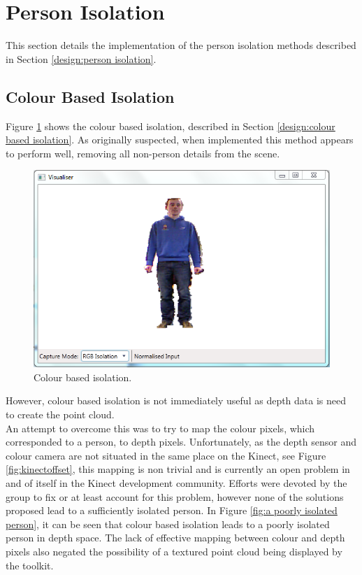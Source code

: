 \section{Person Isolation}
This section details the implementation of the person isolation methods described in Section \ref{design:person isolation}.\\

\subsection{Colour Based Isolation}
\label{imp:colour based isolation}
Figure \ref{fig:colour based cut off} shows the colour based isolation, described in Section \ref{design:colour based isolation}. As originally suspected, when implemented this method appears to perform well, removing all non-person details from the scene.\\

\begin{figure}[h]
    \begin{center}
        \includegraphics[scale=0.4]{images/parse4} 
    \end{center}
    \caption{Colour based isolation.}
    \label{fig:colour based cut off}
\end{figure} 

However, colour based isolation is not immediately useful as depth data is need to create the point cloud.\\ 

An attempt to overcome this was to try to map the colour pixels, which corresponded to a person, to depth pixels. Unfortunately, as the depth sensor and colour camera are not situated in the same place on the Kinect, see Figure \ref{fig:kinectoffset}, this mapping is non trivial and is currently an open problem in and of itself in the Kinect development community. Efforts were devoted by the group to fix or at least account for this problem, however none of the solutions proposed lead to a sufficiently isolated person. In Figure \ref{fig:a poorly isolated person}, it can be seen that colour based isolation leads to a poorly isolated person in depth space. The lack of effective mapping between colour and depth pixels also negated the possibility of a textured point cloud being displayed by the toolkit.\\

